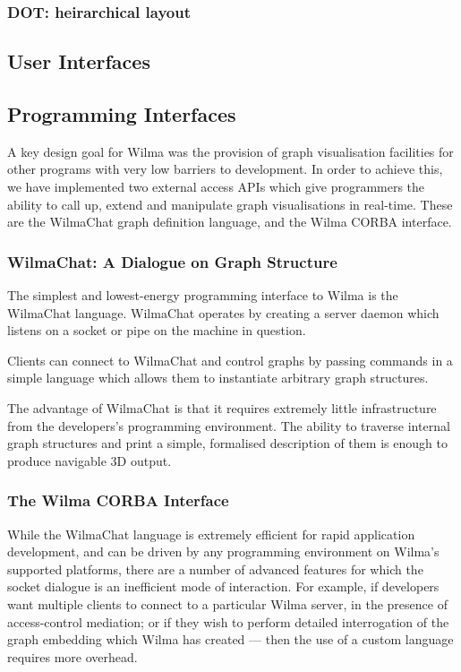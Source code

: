 \documentclass[runningheads]{cl2emult}
\begin{document}
\subsubsection{DOT: heirarchical layout}
\subsection{User Interfaces}
\subsection{Programming Interfaces}

A key design goal for Wilma was the provision of graph visualisation
facilities for other programs with very low barriers to development.  In order
to achieve this, we have implemented two external access APIs which give
programmers the ability to call up, extend and manipulate graph visualisations
in real-time.  These are the WilmaChat graph definition language, and the
Wilma CORBA interface.

\subsubsection{WilmaChat: A Dialogue on Graph Structure}

The simplest and lowest-energy programming interface to Wilma is the WilmaChat
language.  WilmaChat operates by creating a server daemon which listens on a
socket or pipe on the machine in question.

Clients can connect to WilmaChat and control graphs by passing commands
in a simple language which allows them to instantiate arbitrary graph
structures.

The advantage of WilmaChat is that it requires extremely little infrastructure
from the developers's programming environment.  The ability to traverse
internal graph structures and print a simple, formalised description of them
is enough to produce navigable 3D output.

\subsubsection{The Wilma CORBA Interface}

While the WilmaChat language is extremely efficient for rapid application
development, and can be driven by any programming environment on Wilma's
supported platforms, there are a number of advanced features for which the
socket dialogue is an inefficient mode of interaction.  For example, if
developers want multiple clients to connect to a particular Wilma server, in
the presence of access-control mediation; or if they wish to perform detailed
interrogation of the graph embedding which Wilma has created --- then the use
of a custom language requires more overhead.
\end{document}
